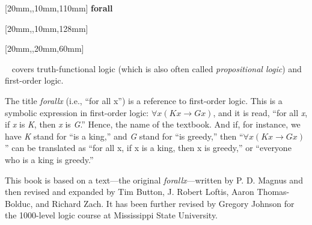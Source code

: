 \documentclass[bleedwidth=6.35mm, marklength=0mm, coverheight=228.6mm, coverwidth=152.4mm, spinewidth=12.3mm]{bookcover} %
\begin{document}
\begin{bookcover}
\pagecolor{forallx-orange}

[20mm,,10mm,110mm]{\sffamily   %
\fontsize{44}{44}\selectfont\hfill \textbf{forall\textcolor{white}{x}}} 		%

[20mm,,10mm,128mm]{\sffamily
\fontsize{20}{20}\selectfont\hfill \textbf{\textls{\textcolor{white}{THE MISSISSIPPI STATE EDITION}}}}  







[20mm,,20mm,60mm]{\sffamily    %
\textcolor{white}{}~ covers truth-functional logic (which is also often called \textit{propositional logic}) and first-order logic. 

\quad The title \textit{forallx} (i.e., ``for all x'') is a reference to first-order logic. This is a symbolic expression in first-order logic: $\forall x(Kx \rightarrow Gx)$, and it is read, ``for all \textit{x}, if \textit{x} is \textit{K}, then \textit{x} is \textit{G}.'' Hence, the name of the textbook. And if, for instance, we have \textit{K} stand for ``is a king,'' and \textit{G} stand for ``is greedy,'' then ``$\forall x(Kx \rightarrow Gx)$'' can be translated as ``for all x, if x is a king, then x is greedy,'' or ``everyone who is a king is greedy.''

\quad This book is based on a text---the original \textit{forallx}---written by P. D. Magnus and then revised and expanded by Tim Button, J. Robert Loftis, Aaron Thomas-Bolduc, and Richard Zach. It has been further revised by Gregory Johnson for the 1000-level logic course at Mississippi State University.

}
\end{bookcover}
\end{document}
